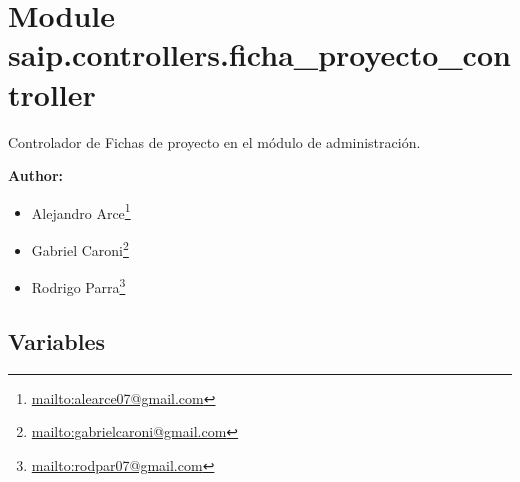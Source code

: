 %
%
%


\section{Module saip.controllers.ficha\_proyecto\_controller}

    \label{saip:controllers:ficha_proyecto_controller}
Controlador de Fichas de proyecto en el módulo de administración.

\textbf{Author:} \begin{itemize}
\setlength{\parskip}{0.6ex}
  \item Alejandro 
    Arce\footnote{\href{mailto:alearce07@gmail.com}{mailto:alearce07@gmail.com}}

  \item Gabriel 
    Caroni\footnote{\href{mailto:gabrielcaroni@gmail.com}{mailto:gabrielcaroni@gmail.com}}

  \item Rodrigo 
    Parra\footnote{\href{mailto:rodpar07@gmail.com}{mailto:rodpar07@gmail.com}}

\end{itemize}





  \subsection{Variables}

